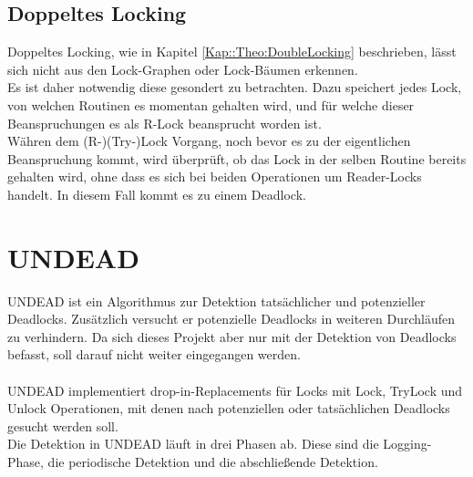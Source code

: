 \subsection{Doppeltes Locking}
Doppeltes Locking, wie in Kapitel \ref{Kap::Theo:DoubleLocking} beschrieben,
 lässt sich nicht aus den Lock-Graphen oder Lock-Bäumen erkennen.\\
Es ist daher notwendig diese gesondert zu betrachten. Dazu speichert jedes Lock, 
von welchen Routinen es momentan gehalten wird, und für welche dieser 
Beanspruchungen es als R-Lock beansprucht worden ist.\\
Währen dem (R-)(Try-)Lock Vorgang, noch bevor es zu der eigentlichen Beanspruchung 
kommt, wird überprüft, ob das Lock in der selben Routine bereits gehalten 
wird, ohne dass es sich bei beiden Operationen um Reader-Locks handelt. In diesem 
Fall kommt es zu einem Deadlock.
\section{UNDEAD}
UNDEAD \cite{zhou} ist ein Algorithmus zur Detektion tatsächlicher und 
potenzieller Deadlocks. Zusätzlich versucht er potenzielle Deadlocks 
in weiteren Durchläufen zu verhindern. Da sich dieses Projekt aber nur mit der 
Detektion von Deadlocks befasst, soll darauf nicht weiter eingegangen werden.\\\\ 
UNDEAD implementiert drop-in-Replacements für Locks mit Lock, TryLock und Unlock
Operationen, mit denen nach potenziellen oder tatsächlichen Deadlocks gesucht 
werden soll.\\
Die Detektion in UNDEAD läuft in drei Phasen ab. Diese sind die Logging-Phase, 
die periodische Detektion und die abschließende Detektion.
